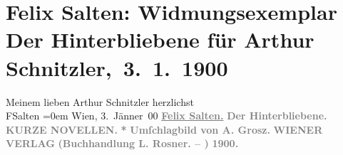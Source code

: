 

         
         \renewcommand{\erwaehntePersonen}{Personen: Adolf Grosz}
         \renewcommand{\erwaehnteInstitutionen}{Institutionen: Buchhandlung L. Rosner, Wiener Verlag}
         \renewcommand{\erwaehnteOrte}{Orte: Wien}
         \renewcommand{\erwaehnteWerke}{Werke: Der Hinterbliebene. Kurze Novellen}
               \section[ Felix Salten: Widmungsexemplar Der Hinterbliebene für Arthur Schnitzler, 3. 1. 1900]{ Felix Salten: Widmungsexemplar Der Hinterbliebene für Arthur
               Schnitzler, 3. 1. 1900}\nopagebreak{}\rehead{ }\begin{ledgroupsized}[t]{13cm}\normalsize\beginnumbering \toendnotes[C]{\smallbreak\pagebreak[2]} 
\toendnotes[C]{\smallbreak}\pstart
           \noindent{}{\pb}Meinem lieben Arthur Schnitzler\pend
           \pstart
           herzlichst{\\[\baselineskip]}\spacefill\mbox{FSalten}\pend
           \leftskip=0em{}\pstart
           Wien, 3. Jänner 00\pend
           {\bigskip}\pstart
           \noindent{}\textcolor{gray}{\textbf{\textbf{\uline{Felix Salten.}}}}\pend
           \pstart
           \centering{}\textcolor{gray}{\textbf{\textbf{Der Hinterbliebene.}}}\pend
           \pstart
           \noindent{}\centering{}\textcolor{gray}{\textbf{KURZE NOVELLEN.}}\pend
           \pstart
           \noindent{}\centering{}\textcolor{gray}{\textbf{*}}\pend
           \pstart
           \noindent{}\centering{}\textcolor{gray}{\textbf{Umſchlagbild von A.
                     Grosz.}}\pend
           {\bigskip}\pstart
           \noindent{}\centering{}\textcolor{gray}{\textbf{WIENER VERLAG}}\pend
           \pstart
           \noindent{}\centering{}\textcolor{gray}{\textbf{\textbf{(Buchhandlung L.
                        Rosner. – \label{K_L03048-1v}\label{K_L03048-1h})}}}\pend
           \pstart
           \noindent{}\centering{}\textcolor{gray}{\textbf{\textbf{1900.}}}\pend
           
         
         \endnumbering{}\end{ledgroupsized}  \newcommand{\dateiname}{L03048}\newcommand{\titel}{Felix Salten: Widmungsexemplar Der Hinterbliebene für Arthur Schnitzler, 3. 1. 1900}\newcommand{\editorInnen}{Martin Anton Müller und Laura Untner}
      